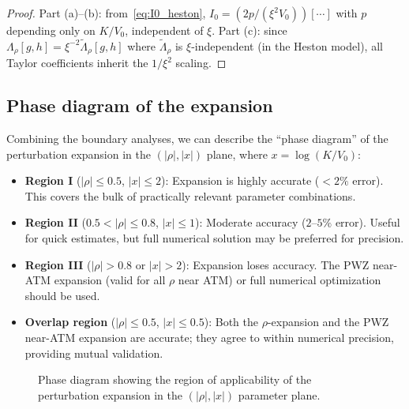 \documentclass[11pt]{article}
\theoremstyle{definition}
\begin{document}
\begin{proof}
Part (a)--(b): from~\eqref{eq:I0_heston}, $I_0 = (2p/(\xi^2 V_0))[\cdots]$ with $p$ depending only on $K/V_0$, independent of $\xi$. Part (c): since $\Lambda_\rho[g,h] = \xi^{-2}\tilde{\Lambda}_\rho[g,h]$ where $\tilde{\Lambda}_\rho$ is $\xi$-independent (in the Heston model), all Taylor coefficients inherit the $1/\xi^2$ scaling.
\end{proof}

\subsection{Phase diagram of the expansion}\label{sec:phase_diagram}

Combining the boundary analyses, we can describe the ``phase diagram'' of the perturbation expansion in the $(|\rho|, |x|)$ plane, where $x = \log(K/V_0)$:

\begin{itemize}
  \item \textbf{Region I} ($|\rho| \leq 0.5$, $|x| \leq 2$): Expansion is highly accurate ($<2\%$ error). This covers the bulk of practically relevant parameter combinations.
  \item \textbf{Region II} ($0.5 < |\rho| \leq 0.8$, $|x| \leq 1$): Moderate accuracy ($2$--$5\%$ error). Useful for quick estimates, but full numerical solution may be preferred for precision.
  \item \textbf{Region III} ($|\rho| > 0.8$ or $|x| > 2$): Expansion loses accuracy. The PWZ near-ATM expansion (valid for all $\rho$ near ATM) or full numerical optimization should be used.
  \item \textbf{Overlap region} ($|\rho| \leq 0.5$, $|x| \leq 0.5$): Both the $\rho$-expansion and the PWZ near-ATM expansion are accurate; they agree to within numerical precision, providing mutual validation.
\end{itemize}

\begin{figure}[h]
\centering
{}
\caption{Phase diagram showing the region of applicability of the perturbation expansion in the $(|\rho|, |x|)$ parameter plane.}\label{fig:phase_diagram}
\end{figure}
\end{document}
